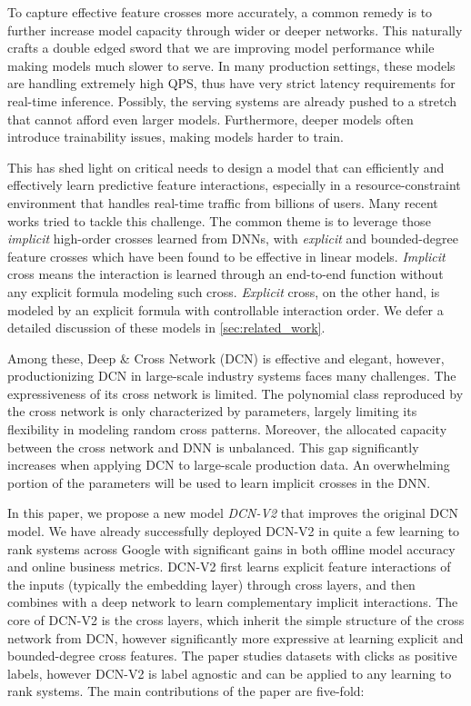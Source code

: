 \documentclass[sigconf]{acmart}
\begin{document}
To capture effective feature crosses more accurately, a common remedy is to further increase model capacity through wider or deeper networks. This naturally crafts a double edged sword that we are improving model performance while making models much slower to serve. In many production settings, these models are handling extremely high QPS, thus have very strict latency requirements for real-time inference. Possibly, the serving systems are already pushed to a stretch that cannot afford even larger models. Furthermore, deeper models often introduce trainability issues, making models harder to train.

This has shed light on critical needs to design a model that can efficiently and effectively learn predictive feature interactions, especially in a resource-constraint environment that handles real-time traffic from billions of users. Many recent works \cite{wang2017deep, cheng2016wide, guo2017deepfm, beutel2018latent, qu2016product, lian2018xdeepfm, song2019autoint, naumov2019deep} tried to tackle this challenge. The common theme is to leverage those \emph{implicit} high-order crosses learned from DNNs, with \emph{explicit} and bounded-degree feature crosses which have been found to be effective in linear models. \emph{Implicit} cross means the interaction is learned through an end-to-end function without any explicit formula modeling such cross. \emph{Explicit} cross, on the other hand, is modeled by an explicit formula with controllable interaction order. We defer a detailed discussion of these models in \autoref{sec:related_work}.

Among these, Deep \& Cross Network (DCN) \cite{wang2017deep} is effective and elegant, however, productionizing DCN in large-scale industry systems faces many challenges. The expressiveness of its cross network is limited. The polynomial class reproduced by the cross network is only characterized by  parameters, largely limiting its flexibility in modeling random cross patterns. 
Moreover, the allocated capacity between the cross network and DNN is unbalanced. This gap significantly increases when applying DCN to large-scale production data. An overwhelming portion of the parameters will be used to learn implicit crosses in the DNN.


In this paper, we propose a new model \emph{{DCN-V2}} that improves the original DCN model. We have already successfully deployed {DCN-V2} in quite a few learning to rank systems across Google with significant gains in both offline model accuracy and online business metrics. {DCN-V2} first learns explicit feature interactions of the inputs (typically the embedding layer) through cross layers, and then combines with a deep network to learn complementary implicit interactions. The core of {DCN-V2} is the cross layers, which inherit the simple structure of the cross network from DCN, however significantly more expressive at learning explicit and bounded-degree cross features. The paper studies datasets with clicks as positive labels, however {DCN-V2} is label agnostic and can be applied to any learning to rank systems.
The main contributions of the paper are five-fold:
\end{document}
